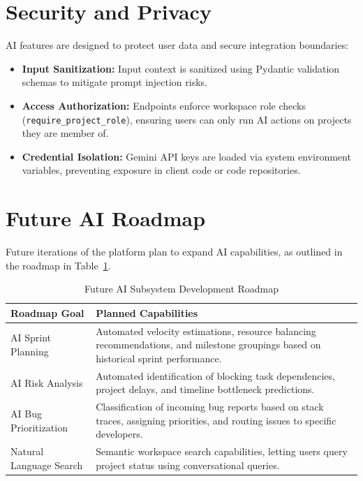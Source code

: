 \section{Security and Privacy}
AI features are designed to protect user data and secure integration boundaries:
\begin{itemize}
    \item \textbf{Input Sanitization:} Input context is sanitized using Pydantic validation schemas to mitigate prompt injection risks.
    \item \textbf{Access Authorization:} Endpoints enforce workspace role checks (\texttt{require\_project\_role}), ensuring users can only run AI actions on projects they are member of.
    \item \textbf{Credential Isolation:} Gemini API keys are loaded via system environment variables, preventing exposure in client code or code repositories.
\end{itemize}

\section{Future AI Roadmap}
Future iterations of the platform plan to expand AI capabilities, as outlined in the roadmap in Table~\ref{tab:future_ai_roadmap}.

\begin{table}[h!]
\centering
\small
\renewcommand{\arraystretch}{1.4}
\begin{tabularx}{\textwidth}{l X}
    \toprule[1.5pt]
    \rowcolor{primary!5}
    \textbf{\color{primary}Roadmap Goal} & \textbf{\color{primary}Planned Capabilities} \\
    \midrule
    AI Sprint Planning & Automated velocity estimations, resource balancing recommendations, and milestone groupings based on historical sprint performance. \\
    AI Risk Analysis & Automated identification of blocking task dependencies, project delays, and timeline bottleneck predictions. \\
    AI Bug Prioritization & Classification of incoming bug reports based on stack traces, assigning priorities, and routing issues to specific developers. \\
    Natural Language Search & Semantic workspace search capabilities, letting users query project status using conversational queries. \\
    \bottomrule[1.5pt]
\end{tabularx}
\caption{Future AI Subsystem Development Roadmap}
\label{tab:future_ai_roadmap}
\end{table}

